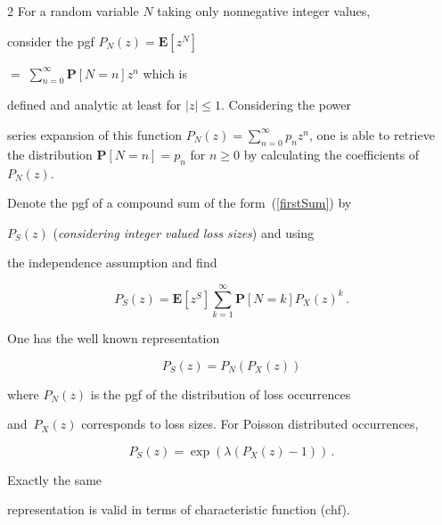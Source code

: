 \begin{multicols}{2}
For a random variable $N$ taking only nonnegative integer values,

consider the pgf $P_N(z) =

\mathbf{E}[z^N]$\linebreak

$=\;\sum\limits_{n=0}^\infty \mathbf{P}[N=n] z^n$ which is

defined and analytic at least for $|z|\le1$. Considering the power

series expansion of this function $P_N(z) = \sum\limits_{n=0}^\infty p_n

z^n$, one is able to retrieve the distribution $\mathbf{P}[N = n] =

p_n$ for $n \ge 0$ by calculating the coefficients of~$P_N(z)$.

Denote the pgf of a compound sum of the form~(\ref{firstSum}) by

$P_S(z)$ ({\it considering integer valued loss sizes}) and using

the independence assumption and find

\begin{equation*}


P_S(z)=\mathbf{E}[z^S]\sum_{k=1}^{\infty} \mathbf{P}[N=k]

P_X(z)^k\,.

\end{equation*}

One has the well known representation

\begin{equation}

\label{eq:pgfCompoundSum}

    P_S(z) = P_N(P_X(z))

\end{equation}

where $P_N(z)$ is the pgf of the distribution of loss occurrences

and~$P_X(z)$ corresponds to loss sizes.  For Poisson distributed occurrences,

\begin{equation*}


        P_S(z) = \exp(\lambda(P_X(z)-1))\,.

\end{equation*}

Exactly the same

representation is valid in terms of characteristic function (chf).




\end{multicols}
